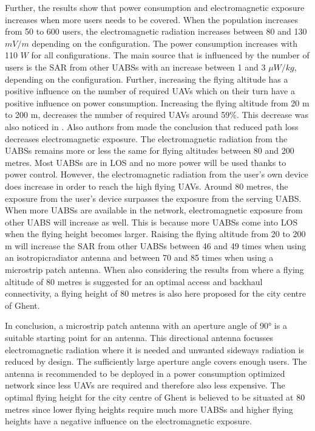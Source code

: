 \documentclass[twocolumn]{phdsymp} %
\begin{document}
Further, the results show that power 
consumption and electromagnetic exposure increases when more users needs to be covered.
When the population increases from 50 to 600 users, 
the electromagnetic radiation increases between 80 and 130 $mV/m$ depending
on the configuration. The power consumption increases with 110 $W$ for all configurations. 
The main source that is influenced by the number of users is the \gls{SAR} from other UABSs with an increase between 1 and 3 $\mu W/kg$, depending on 
the configuration.
Further, increasing the flying altitude has a positive influence on the number of required \gls{UAV}s which on their 
turn have a positive influence on power consumption. Increasing the flying altitude from 20 m to 200 m, decreases the number 
of required \gls{UAV}s around 59\%. This decrease was also noticed in \cite{J2}.
Also authors from \cite{J17_kuehn2019modelling} made the conclusion that reduced path loss decreases electromagnetic exposure.
The electromagnetic radiation from the \gls{UABS}s remains more or less the same for flying altitudes between 80 and 200 metres. Most 
\gls{UABS}s are in \gls{LOS} and no more power will be used thanks to power control.
However, the electromagnetic radiation from the user's own device does increase in order to reach the high flying \gls{UAV}s.
Around 80 metres, the exposure from the  user's device surpasses the exposure from the serving \gls{UABS}.
When more \gls{UABS}s are available in the network, electromagnetic exposure from other \gls{UABS} will increase as well.
This is because more \gls{UABS}s come into \gls{LOS} when the flying height becomes larger. Raising the flying altitude from 20 to 200 m will increase the \gls{SAR} from other 
\gls{UABS}s between 46 and 49 times when using an \gls{isotropicradiator} antenna and between 70 and 85 times when using a microstrip patch antenna.
When also considering the results from \cite{U1} where a flying altitude of  
80 metres is suggested for an optimal access and backhaul connectivity, a flying height 
of 80 metres is also here proposed for the city centre of Ghent.

In conclusion, a microstrip patch antenna with an aperture angle of \ang{90} is a suitable starting point for an antenna. 
This directional antenna focusses electromagnetic radiation where it is needed and unwanted sideways radiation 
is reduced by design.
The sufficiently large aperture angle covers enough users. The antenna is recommended to be deployed in a power consumption 
optimized network since less \gls{UAV}s are required and therefore also less expensive.
The optimal flying height for the city centre of Ghent is believed to be situated at 80 metres since lower flying heights require much more \gls{UABS}s and
higher flying heights have a negative influence on the electromagnetic exposure.  
\end{document}
